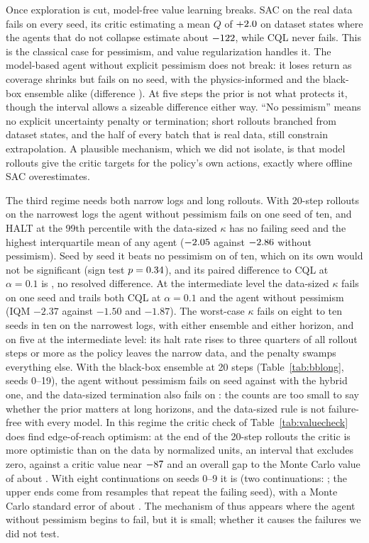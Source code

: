 \documentclass[11pt]{article}
\begin{document}
Once exploration is cut, model-free value learning breaks. SAC on the real data fails on every seed, its critic estimating a mean $Q$ of $+2.0$ on dataset states where the agents that do not collapse estimate about $-122$, while CQL never fails. This is the classical case for pessimism, and value regularization handles it. The model-based agent without explicit pessimism does not break: it loses return as coverage shrinks but fails on no seed, with the physics-informed and the black-box ensemble alike (difference ). At five steps the prior is not what protects it, though the interval allows a sizeable difference either way. ``No pessimism'' means no explicit uncertainty penalty or termination; short rollouts branched from dataset states, and the half of every batch that is real data, still constrain extrapolation. A plausible mechanism, which we did not isolate, is that model rollouts give the critic targets for the policy's own actions, exactly where offline SAC overestimates.

The third regime needs both narrow logs and long rollouts. With 20-step rollouts on the narrowest logs the agent without pessimism fails on one seed of ten, and HALT at the 99th percentile with the data-sized $\kappa$ has no failing seed and the highest interquartile mean of any agent ($-2.05$ against $-2.86$ without pessimism). Seed by seed it beats no pessimism on  of ten, which on its own would not be significant (sign test $p=0.34$), and its paired difference to CQL at $\alpha=0.1$ is , no resolved difference. At the intermediate level the data-sized $\kappa$ fails on one seed and trails both CQL at $\alpha=0.1$ and the agent without pessimism (IQM $-2.37$ against $-1.50$ and $-1.87$). The worst-case $\kappa$ fails on eight to ten seeds in ten on the narrowest logs, with either ensemble and either horizon, and on five at the intermediate level: its halt rate rises to three quarters of all rollout steps or more as the policy leaves the narrow data, and the penalty swamps everything else. With the black-box ensemble at 20 steps (Table~\ref{tab:bblong}, seeds 0--19), the agent without pessimism fails on \bbnopfails{} seed against \hynopfails{} with the hybrid one, and the data-sized termination also fails on \bbdatafails: the counts are too small to say whether the prior matters at long horizons, and the data-sized rule is not failure-free with every model. In this regime the critic check of Table~\ref{tab:valuecheck} does find edge-of-reach optimism: at the end of the 20-step rollouts the critic is more optimistic than on the data by \vcextralastnarrow{} normalized units, an interval that excludes zero, against a critic value near $-87$ and an overall gap to the Monte Carlo value of about \vcgapnarrow. With eight continuations on seeds 0--9 it is \vceightnarrow{} (two continuations: \vctwonarrow; the upper ends come from resamples that repeat the failing seed), with a Monte Carlo standard error of about \vcsenarrow. The mechanism of \citet{sims2024edge} thus appears where the agent without pessimism begins to fail, but it is small; whether it causes the failures we did not test.
\end{document}
